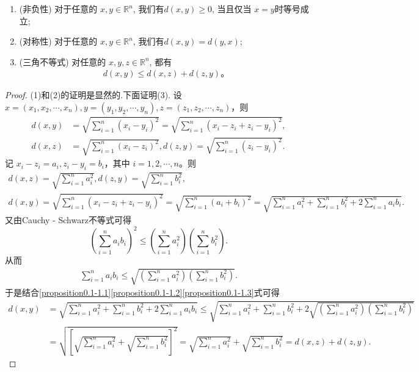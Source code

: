 \documentclass[../../main.tex]{subfiles}
\begin{document}
\begin{proposition}
\begin{enumerate}[(1)]
\item (非负性) 对于任意的 $x, y \in \mathbb{R}^n$, 我们有$d(x, y) \geqslant 0$, 当且仅当 $x = y$时等号成立;
\item (对称性) 对于任意的 $x, y \in \mathbb{R}^n$, 我们有$d(x, y) = d(y, x)$;
\item (三角不等式) 对任意的 $x, y, z \in \mathbb{R}^n$, 都有
\begin{align*}
d(x, y) \leqslant d(x, z) + d(z, y)。
\end{align*}
\end{enumerate}
\end{proposition}
\begin{proof}
(1)和(2)的证明是显然的.下面证明(3).
设 $x=(x_1,x_2,\cdots,x_n),y=(y_1,y_2,\cdots,y_n),z=(z_1,z_2,\cdots,z_n)$，则
\begin{align*}
d(x,y) &=\sqrt{\sum_{i = 1}^n (x_i - y_i)^2}=\sqrt{\sum_{i = 1}^n (x_i - z_i + z_i - y_i)^2},\\
d(x,z) &=\sqrt{\sum_{i = 1}^n (x_i - z_i)^2},d(z,y)=\sqrt{\sum_{i = 1}^n (z_i - y_i)^2}.
\end{align*}
记 $x_i - z_i = a_i,z_i - y_i = b_i$，其中 $i = 1,2,\cdots,n$。则
\begin{gather}
d(x,z) =\sqrt{\sum_{i = 1}^n a_{i}^{2}},d(z,y)=\sqrt{\sum_{i = 1}^n b_{i}^{2}},\label{proposition0.1-1.1}\\
d(x,y) =\sqrt{\sum_{i = 1}^n (x_i - z_i + z_i - y_i)^2}=\sqrt{\sum_{i = 1}^n (a_i + b_i)^2}=\sqrt{\sum_{i = 1}^n a_{i}^{2}+\sum_{i = 1}^n b_{i}^{2}+2\sum_{i = 1}^n a_ib_i}.\label{proposition0.1-1.2}
\end{gather}
又由Cauchy - Schwarz不等式可得
\[
(\sum_{i = 1}^n a_ib_i)^2\leqslant (\sum_{i = 1}^n a_{i}^{2})(\sum_{i = 1}^n b_{i}^{2}).
\]
从而
\begin{align}
\sum_{i = 1}^n a_ib_i\leqslant \sqrt{(\sum_{i = 1}^n a_{i}^{2})(\sum_{i = 1}^n b_{i}^{2})}.\label{proposition0.1-1.3}
\end{align}
于是结合\eqref{proposition0.1-1.1}\eqref{proposition0.1-1.2}\eqref{proposition0.1-1.3}式可得
\begin{align*}
d(x,y) &=\sqrt{\sum_{i = 1}^n a_{i}^{2}+\sum_{i = 1}^n b_{i}^{2}+2\sum_{i = 1}^n a_ib_i}\leqslant \sqrt{\sum_{i = 1}^n a_{i}^{2}+\sum_{i = 1}^n b_{i}^{2}+2\sqrt{(\sum_{i = 1}^n a_{i}^{2})(\sum_{i = 1}^n b_{i}^{2})}}\\
&=\sqrt{[\sqrt{\sum_{i = 1}^n a_{i}^{2}}+\sqrt{\sum_{i = 1}^n b_{i}^{2}}]^2}=\sqrt{\sum_{i = 1}^n a_{i}^{2}}+\sqrt{\sum_{i = 1}^n b_{i}^{2}}=d(x,z)+d(z,y).
\end{align*} 

\end{proof}
\end{document}
